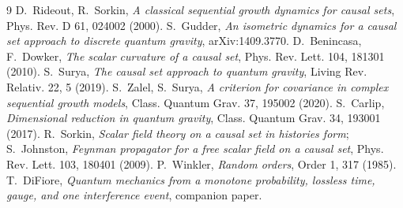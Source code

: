 \documentclass[11pt]{article}
\begin{document}
\begin{thebibliography}{9}
 D.~Rideout, R.~Sorkin, \emph{A classical sequential
growth dynamics for causal sets}, Phys. Rev. D 61, 024002 (2000).
 S.~Gudder, \emph{An isometric dynamics for a causal
set approach to discrete quantum gravity}, arXiv:1409.3770.
 D.~Benincasa, F.~Dowker, \emph{The scalar curvature of a
causal set}, Phys. Rev. Lett. 104, 181301 (2010).
 S.~Surya, \emph{The causal set approach to quantum
gravity}, Living Rev. Relativ. 22, 5 (2019).
 S.~Zalel, S.~Surya, \emph{A criterion for covariance
in complex sequential growth models}, Class. Quantum Grav. 37, 195002
(2020).
 S.~Carlip, \emph{Dimensional reduction in quantum
gravity}, Class. Quantum Grav. 34, 193001 (2017).
 R.~Sorkin, \emph{Scalar field theory on a causal set in
histories form}; S.~Johnston, \emph{Feynman propagator for a free
scalar field on a causal set}, Phys. Rev. Lett. 103, 180401 (2009).
 P.~Winkler, \emph{Random orders}, Order 1, 317
(1985).
 T.~DiFiore, \emph{Quantum mechanics from a monotone
probability, lossless time, gauge, and one interference event},
companion paper.
\end{thebibliography}
\end{document}
